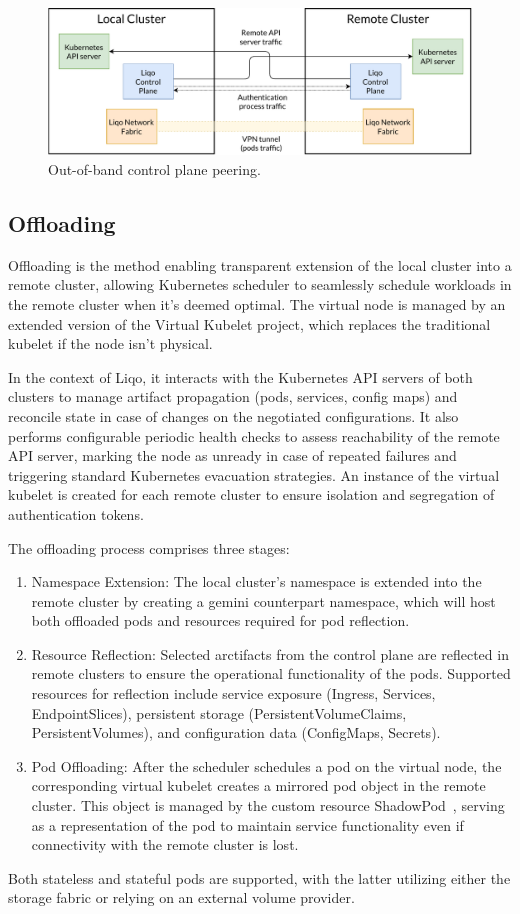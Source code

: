 \begin{figure}[ht]\centering
\includegraphics[scale=0.6] {Pictures/out-of-band}
\caption{Out-of-band control plane peering.}\label{fig:out-band}
\end{figure}

\subsection{Offloading}
Offloading is the method enabling transparent extension of the local cluster into a remote cluster, allowing Kubernetes scheduler to seamlessly schedule workloads in the remote cluster when it's deemed optimal. The virtual node is managed by an extended version of the Virtual Kubelet project, which replaces the traditional kubelet if the node isn't physical. 

In the context of Liqo, it interacts with the Kubernetes API servers of both clusters to manage artifact propagation (pods, services, config maps) and reconcile state in case of changes on the negotiated configurations. It also performs configurable periodic health checks to assess reachability of the remote API server, marking the node as unready in case of repeated failures and triggering standard Kubernetes evacuation strategies. An instance of the virtual kubelet is created for each remote cluster to ensure isolation and segregation of authentication tokens.

The offloading process comprises three stages:
\begin{enumerate}
\item Namespace Extension: The local cluster's namespace is extended into the remote cluster by creating a gemini counterpart namespace, which will host both offloaded pods and resources required for pod reflection.
\item Resource Reflection: Selected arctifacts from the control plane are reflected in remote clusters to ensure the operational functionality of the pods. Supported resources for reflection include service exposure (Ingress, Services, EndpointSlices), persistent storage (PersistentVolumeClaims, PersistentVolumes), and configuration data (ConfigMaps, Secrets).
\item Pod Offloading: After the scheduler schedules a pod on the virtual node, the corresponding virtual kubelet creates a mirrored pod object in the remote cluster. This object is managed by the custom resource ShadowPod~\cite{l1-2}, serving as a representation of the pod to maintain service functionality even if connectivity with the remote cluster is lost.
\end{enumerate}
Both stateless and stateful pods are supported, with the latter utilizing either the storage fabric or relying on an external volume provider.

